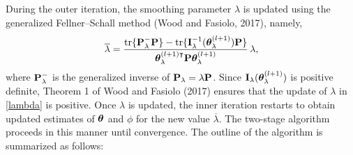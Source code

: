 During the outer iteration, the smoothing parameter $\lambda$ is updated using the generalized Fellner--Schall method (Wood and Fasiolo, 2017), namely,
\begin{align}\label{lambda}
	\overline{\lambda}
	= \frac{\mathrm{tr}\{\mathbf{P}_\lambda^{-}\mathbf{P}\} - \mathrm{tr}\{\mathbf{I}_\lambda^{-1}(\bm\theta^{(l+1)}_\lambda)\mathbf{P}\}}
	{\bm\theta_\lambda^{(l+1)\intercal}\mathbf{P}\bm\theta^{(l+1)}_\lambda}\,\lambda,
\end{align}
where $\mathbf{P}_\lambda^{-}$ is the generalized inverse of $\mathbf{P}_\lambda = \lambda\mathbf{P}$. Since $\mathbf{I}_\lambda(\bm\theta^{(l+1)}_\lambda)$ is positive definite, Theorem 1 of Wood and Fasiolo (2017) ensures that the update of $\lambda$ in \eqref{lambda} is positive. Once $\lambda$ is updated, the inner iteration restarts to obtain updated estimates of $\bm\theta$ and $\phi$ for the new value $\overline{\lambda}$. The two-stage algorithm proceeds in this manner until convergence. The outline of the algorithm is summarized as follows:
\vspace{-0.35cm}
